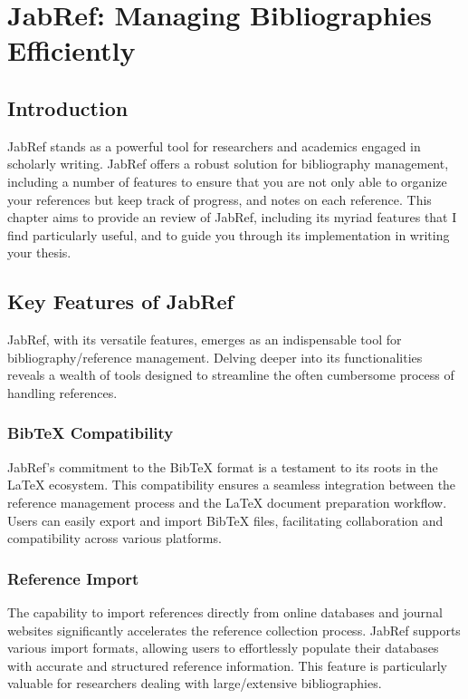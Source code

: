 \chapter{JabRef: Managing Bibliographies Efficiently}\label{ch:JabRef}
	\section{Introduction}\label{sec:JRIntroduction}
		JabRef stands as a powerful tool for researchers and academics engaged in scholarly writing.
		JabRef offers a robust solution for bibliography management, including a number of features to ensure that you are not only able to organize your references but keep track of progress, and notes on each reference.
		This chapter aims to provide an review of JabRef, including its myriad features that I find particularly useful, and to guide you through its implementation in writing your thesis.

	\section{Key Features of JabRef}
		JabRef, with its versatile features, emerges as an indispensable tool for bibliography/reference management. 
		Delving deeper into its functionalities reveals a wealth of tools designed to streamline the often cumbersome process of handling references. 

		\subsection{BibTeX Compatibility}
			JabRef's commitment to the BibTeX format is a testament to its roots in the \LaTeX{} ecosystem. 
			This compatibility ensures a seamless integration between the reference management process and the \LaTeX{} document preparation workflow. 
			Users can easily export and import BibTeX files, facilitating collaboration and compatibility across various platforms.

		\subsection{Reference Import}
			The capability to import references directly from online databases and journal websites significantly accelerates the reference collection process. 
			JabRef supports various import formats, allowing users to effortlessly populate their databases with accurate and structured reference information. 
			This feature is particularly valuable for researchers dealing with large/extensive bibliographies.

